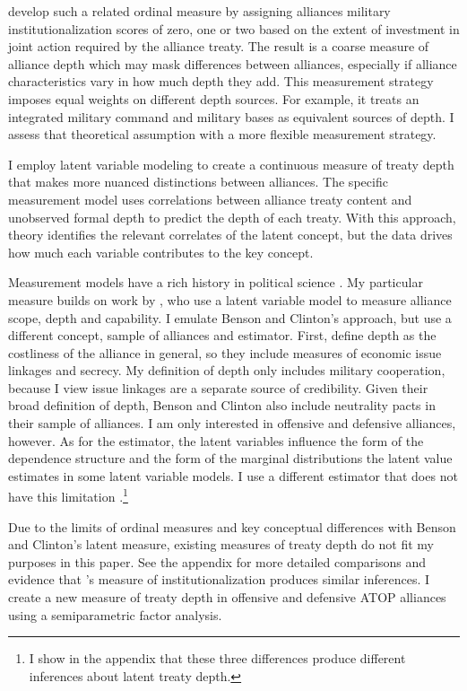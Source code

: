 \documentclass[12pt]{article}
\begin{document}
\citep{LeedsAnac2005} develop such a related ordinal measure by assigning alliances military institutionalization scores of zero, one or two based on the extent of investment in joint action required by the alliance treaty. 
The result is a coarse measure of alliance depth which may mask differences between alliances, especially if alliance characteristics vary in how much depth they add. 
This measurement strategy imposes equal weights on different depth sources.
For example, it treats an integrated military command and military bases as equivalent sources of depth. 
I assess that theoretical assumption with a more flexible measurement strategy.
 
 
I employ latent variable modeling to create a continuous measure of treaty depth that makes more nuanced distinctions between alliances.
The specific measurement model uses correlations between alliance treaty content and unobserved formal depth to predict the depth of each treaty. 
With this approach, theory identifies the relevant correlates of the latent concept, but the data drives how much each variable contributes to the key concept. 


Measurement models have a rich history in political science \citep{Clintonetal2004, TreierJackman2008, Fariss2014}.
My particular measure builds on work by \citet{BensonClinton2016}, who use a latent variable model \citep{Quinn2004} to measure alliance scope, depth and capability.  
I emulate Benson and Clinton's approach, but use a different concept, sample of alliances and estimator. 
First, \citet{BensonClinton2016} define depth as the costliness of the alliance in general, so they include measures of economic issue linkages and secrecy.
My definition of depth only includes military cooperation, because I view issue linkages are a separate source of credibility. 
Given their broad definition of depth, Benson and Clinton also include neutrality pacts in their sample of alliances.
I am only interested in offensive and defensive alliances, however.  
As for the estimator, the latent variables influence the form of the dependence structure and the form of the marginal distributions the latent value estimates in some latent variable models. 
I use a different estimator that does not have this limitation \citep{Murrayetal2013}.\footnote{I show in the appendix that these three differences produce different inferences about latent treaty depth.}


Due to the limits of ordinal measures and key conceptual differences with Benson and Clinton's latent measure, existing measures of treaty depth do not fit my purposes in this paper. 
See the appendix for more detailed comparisons and evidence that \citet{LeedsAnac2005}'s measure of institutionalization produces similar inferences. 
I create a new measure of treaty depth in offensive and defensive ATOP alliances using a semiparametric factor analysis. 
\end{document}
